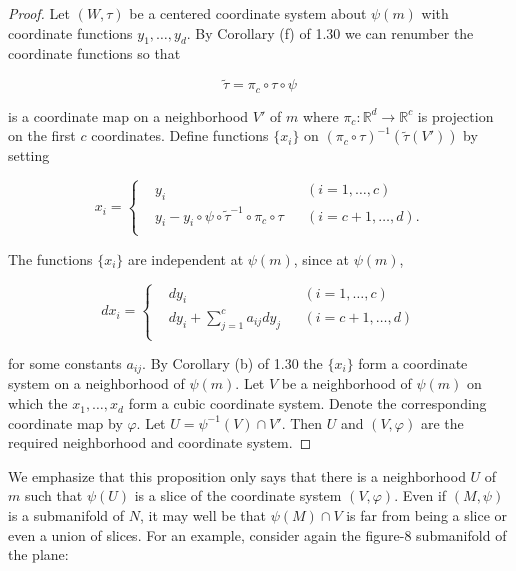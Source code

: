 \begin{proof}
	Let $(W,\tau)$ be a centered coordinate system about $\psi(m)$ with coordinate functions $y_{1},\ldots,y_{d}$. By Corollary (f) of 1.30 we can renumber the coordinate functions so that

	\begin{equation}
		\tag{1}\label{eq:1.35:1}
		\tilde{\tau}=\pi_{c}\circ\tau\circ\psi
	\end{equation}

	is a coordinate map on a neighborhood $V'$ of $m$ where $\pi_c\colon\mathbb{R}^d\to\mathbb{R}^c$ is projection on the first $c$ coordinates. Define functions $\{x_i\}$ on $(\pi_c\circ\tau)^{-1}(\tilde{\tau}(V'))$ by setting

	\begin{equation}
		\tag{2}\label{eq:1.35:2}
		x_{i}=\left\{\begin{aligned}{}&{{}y_{i}}&{}&{{}(i=1,\ldots,c)}\\ {}&{{}y_{i}-y_{i}\circ\psi\circ\tilde{\tau}^{-1}\circ\pi_{c}\circ\tau}&{}&{{}(i=c+1,\ldots,d).}\\ \end{aligned}\right.
	\end{equation}

	The functions $\{x_{i}\}$ are independent at $\psi(m)$, since at $\psi(m)$,

	\begin{equation}
		\tag{3}\label{eq:1.35:3}
		d x_{i}=\left\{\begin{aligned}{}&{{}d y_{i}}&{}&{{}(i=1,\ldots,c)}\\ {}&{{}d y_{i}+\sum_{j=1}^{c}a_{i j}d y_{j}}&{}&{{}(i=c+1,\ldots,d)}\\ \end{aligned}\right.
	\end{equation}

	for some constants $a_{ij}$. By Corollary (b) of 1.30 the $\{x_i\}$ form a coordinate system on a neighborhood of $\psi(m)$. Let $V$ be a neighborhood of $\psi(m)$ on which the $x_1, \ldots, x_d$ form a cubic coordinate system. Denote the corresponding coordinate map by $\varphi$. Let $U = \psi^{-1}(V) \cap V'$. Then $U$ and $(V, \varphi)$ are the required neighborhood and coordinate system.
\end{proof}

\begin{center}
\end{center}

We emphasize that this proposition only says that there is a neighborhood $U$ of $m$ such that $\psi(U)$ is a slice of the coordinate system $(V,\varphi)$. Even if $(M,\psi)$ is a submanifold of $N$, it may well be that $\psi(M)\cap V$ is far from being a slice or even a union of slices. For an example, consider again the figure-8 submanifold of the plane:

